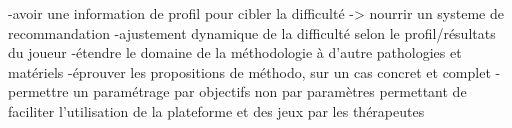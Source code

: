 	-avoir une information de profil pour cibler la difficulté -> nourrir un systeme de recommandation
	-ajustement dynamique de la difficulté selon le profil/résultats du joueur
	-étendre le domaine de la méthodologie à d'autre pathologies et matériels
	-éprouver les propositions de méthodo, sur un cas concret et complet
	-permettre un paramétrage par objectifs non par paramètres permettant de faciliter l'utilisation de la plateforme et des jeux par les thérapeutes
